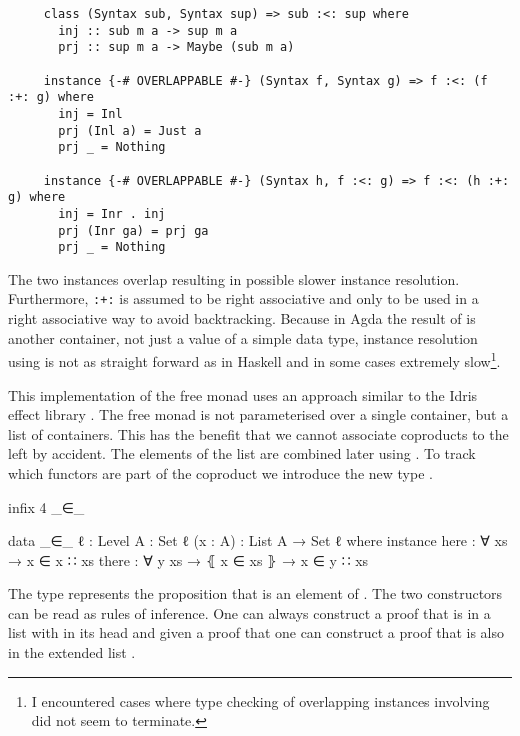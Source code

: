 \begin{verbatim}
     class (Syntax sub, Syntax sup) => sub :<: sup where
       inj :: sub m a -> sup m a
       prj :: sup m a -> Maybe (sub m a)

     instance {-# OVERLAPPABLE #-} (Syntax f, Syntax g) => f :<: (f :+: g) where
       inj = Inl
       prj (Inl a) = Just a
       prj _ = Nothing

     instance {-# OVERLAPPABLE #-} (Syntax h, f :<: g) => f :<: (h :+: g) where
       inj = Inr . inj
       prj (Inr ga) = prj ga
       prj _ = Nothing
\end{verbatim}
The two instances overlap resulting in possible slower instance resolution.
Furthermore, \texttt{:+:} is assumed to be right associative and only to be
used in a right associative way to avoid backtracking.
Because in Agda the result of  is another container, not
just a value of a simple data type, instance resolution using
 is not as straight forward as in Haskell and in some cases
extremely slow\footnote{I encountered cases where type checking of overlapping
instances involving  did not seem to terminate.}.

This implementation of the free monad uses an approach similar to the Idris
effect library \cite{DBLP:conf/icfp/Brady13}.
The free monad is not parameterised over a single container, but a list
 of containers.
This has the benefit that we cannot associate coproducts to the left by
accident.
The elements of the list are combined later using .
To track which functors are part of the coproduct we introduce the new type
.

\begin{code}[hide]
infix 4 _∈_
\end{code}
\begin{code}
data _∈_ {ℓ : Level} {A : Set ℓ} (x : A) : List A → Set ℓ where
  instance
    here   : ∀ {xs} → x ∈ x ∷ xs
    there  : ∀ {y xs} → ⦃ x ∈ xs ⦄ → x ∈ y ∷ xs
\end{code}
The type
\AgdaSpace{}\AgdaSpace{}
represents the proposition that  is an element of
.
The two constructors can be read as rules of inference.
One can always construct a proof that  is in a list with
 in its head and given a proof that
\AgdaSpace{}\AgdaSpace{}
one can construct a proof that  is also in the extended list
\AgdaSpace{}\AgdaSpace{}.

